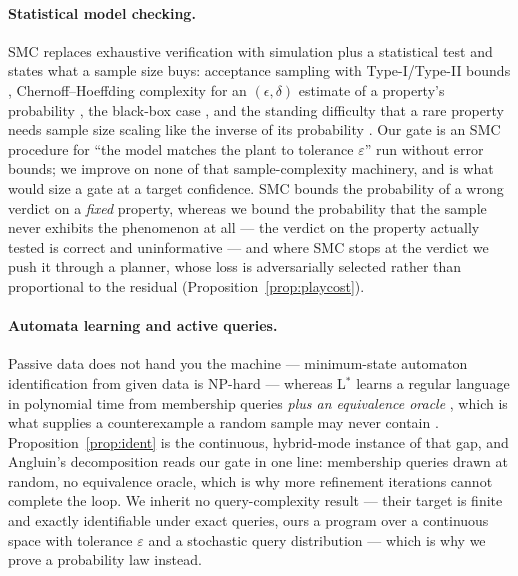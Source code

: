 \paragraph{Statistical model checking.} SMC replaces exhaustive verification with simulation plus a statistical test and states what a sample size buys: acceptance sampling with Type-I/Type-II bounds \citep{younes2002acceptance}, Chernoff--Hoeffding complexity for an $(\epsilon,\delta)$ estimate of a property's probability \citep{herault2004apmc}, the black-box case \citep{sen2004blackbox}, and the standing difficulty that a rare property needs sample size scaling like the inverse of its probability \citep{legay2010smc}. Our gate is an SMC procedure for ``the model matches the plant to tolerance $\varepsilon$'' run without error bounds; we improve on none of that sample-complexity machinery, and \citet{herault2004apmc} is what would size a gate at a target confidence. SMC bounds the probability of a wrong verdict on a \emph{fixed} property, whereas we bound the probability that the sample never exhibits the phenomenon at all --- the verdict on the property actually tested is correct and uninformative --- and where SMC stops at the verdict we push it through a planner, whose loss is adversarially selected rather than proportional to the residual (Proposition~\ref{prop:playcost}).

\paragraph{Automata learning and active queries.} Passive data does not hand you the machine --- minimum-state automaton identification from given data is NP-hard \citep{gold1978complexity} --- whereas L$^*$ learns a regular language in polynomial time from membership queries \emph{plus an equivalence oracle} \citep{angluin1987learning}, which is what supplies a counterexample a random sample may never contain \citep{vaandrager2017model,settles2012active}. Proposition~\ref{prop:ident} is the continuous, hybrid-mode instance of that gap, and Angluin's decomposition reads our gate in one line: membership queries drawn at random, no equivalence oracle, which is why more refinement iterations cannot complete the loop. We inherit no query-complexity result --- their target is finite and exactly identifiable under exact queries, ours a program over a continuous space with tolerance $\varepsilon$ and a stochastic query distribution --- which is why we prove a probability law instead.

